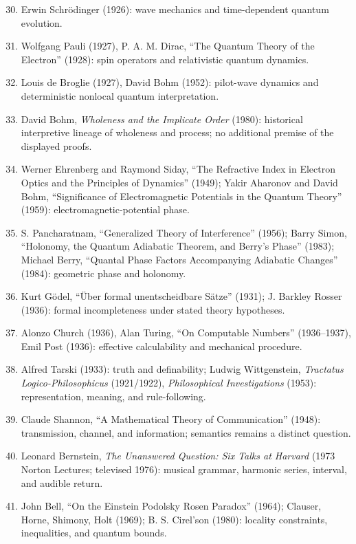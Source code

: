 \documentclass[10pt]{article}
\begin{document}
\begin{enumerate}[itemsep=1pt,topsep=3pt]\setcounter{enumi}{29}
\item Erwin Schr\"odinger (1926): wave mechanics and time-dependent quantum evolution.
\item Wolfgang Pauli (1927), P. A. M. Dirac, ``The Quantum Theory of the Electron'' (1928): spin operators and relativistic quantum dynamics.
\item Louis de Broglie (1927), David Bohm (1952): pilot-wave dynamics and deterministic nonlocal quantum interpretation.
\item David Bohm, \emph{Wholeness and the Implicate Order} (1980): historical interpretive lineage of wholeness and process; no additional premise of the displayed proofs.
\item Werner Ehrenberg and Raymond Siday, ``The Refractive Index in Electron Optics and the Principles of Dynamics'' (1949); Yakir Aharonov and David Bohm, ``Significance of Electromagnetic Potentials in the Quantum Theory'' (1959): electromagnetic-potential phase.
\item S. Pancharatnam, ``Generalized Theory of Interference'' (1956); Barry Simon, ``Holonomy, the Quantum Adiabatic Theorem, and Berry's Phase'' (1983); Michael Berry, ``Quantal Phase Factors Accompanying Adiabatic Changes'' (1984): geometric phase and holonomy.
\item Kurt G\"odel, ``\"Uber formal unentscheidbare S\"atze'' (1931); J. Barkley Rosser (1936): formal incompleteness under stated theory hypotheses.
\item Alonzo Church (1936), Alan Turing, ``On Computable Numbers'' (1936--1937), Emil Post (1936): effective calculability and mechanical procedure.
\item Alfred Tarski (1933): truth and definability; Ludwig Wittgenstein, \emph{Tractatus Logico-Philosophicus} (1921/1922), \emph{Philosophical Investigations} (1953): representation, meaning, and rule-following.
\item Claude Shannon, ``A Mathematical Theory of Communication'' (1948): transmission, channel, and information; semantics remains a distinct question.
\item Leonard Bernstein, \emph{The Unanswered Question: Six Talks at Harvard} (1973 Norton Lectures; televised 1976): musical grammar, harmonic series, interval, and audible return.
\item John Bell, ``On the Einstein Podolsky Rosen Paradox'' (1964); Clauser, Horne, Shimony, Holt (1969); B. S. Cirel'son (1980): locality constraints, inequalities, and quantum bounds.
\end{enumerate}
\end{document}
